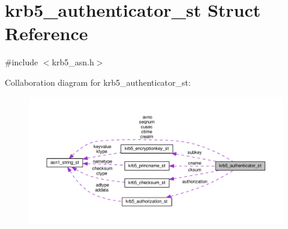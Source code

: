 \hypertarget{structkrb5__authenticator__st}{}\section{krb5\+\_\+authenticator\+\_\+st Struct Reference}
\label{structkrb5__authenticator__st}


{\ttfamily \#include $<$krb5\+\_\+asn.\+h$>$}



Collaboration diagram for krb5\+\_\+authenticator\+\_\+st\+:
\nopagebreak
\begin{figure}[H]
\begin{center}
\leavevmode
\includegraphics[width=350pt]{structkrb5__authenticator__st__coll__graph}
\end{center}
\end{figure}
